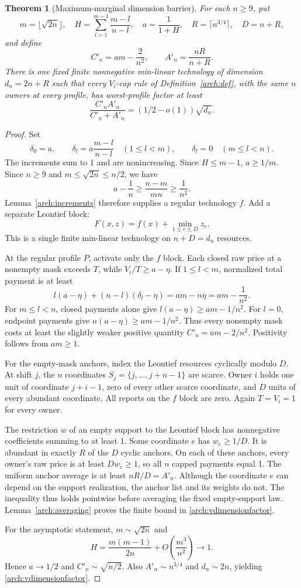\documentclass[11pt]{article}
\newtheorem{theorem}{Theorem}[section]
\theoremstyle{definition}\newtheorem{definition}[theorem]{Definition}
\theoremstyle{remark}\newtheorem{remark}[theorem]{Remark}
\begin{document}
\begin{theorem}[Maximum-marginal dimension barrier]
\label{arch:vdimension}
For each $n\ge9$, put
\[
 m=\lfloor\sqrt{2n}\rfloor,\quad
 H=\sum_{l=1}^{m-1}\frac{m-l}{n-l},\quad a=\frac1{1+H},
 \quad R=\lceil n^{3/4}\rceil,\quad D=n+R,
\]
and define
\[
 C'_n=am-\frac2{n^2},\qquad A'_n=\frac{nR}{n+R}.
\]
There is one fixed finite nonnegative min-linear technology of dimension
$d_n=2n+R$ such that every $V_i$-cap rule of
Definition~\ref{arch:def}, with the same $n$ owners at every profile, has
worst-profile factor at least
\begin{equation}\label{arch:vdimensionfactor}
 \frac{C'_nA'_n}{C'_n+A'_n}
       =(1/2-o(1))\sqrt{d_n}.
\end{equation}
\end{theorem}
\begin{proof}
Set
\[
 \delta_0=a,\qquad
 \delta_l=a\frac{m-l}{n-l}\quad(1\le l<m),\qquad
 \delta_l=0\quad(m\le l<n).
\]
The increments sum to 1 and are nonincreasing. Since $H\le m-1$,
$a\ge1/m$. Since $n\ge9$ and $m\le\sqrt{2n}\le n/2$, we have
\[
 a-\frac1n\ge\frac{n-m}{mn}\ge\frac1{n^2}.
\]
Lemma~\ref{arch:increments} therefore supplies a regular technology $f$.
Add a separate Leontief block:
\[
 F(x,z)=f(x)+\min_{1\le e\le D}z_e.
\]
This is a single finite min-linear technology on $n+D=d_n$ resources.

At the regular profile $P$, activate only the $f$ block. Each closed
raw price at a nonempty mask exceeds $T$, while
$V_i/T\ge a-\eta$. If $1\le l<m$, normalized total payment is at least
\[
 l(a-\eta)+(n-l)(\delta_l-\eta)
 =am-n\eta=am-\frac1{n^2}.
\]
For $m\le l<n$, closed payments alone give
$l(a-\eta)\ge am-1/n^2$. For $l=0$, endpoint payments give
$n(a-\eta)\ge am-1/n^2$. Thus every nonempty mask costs at least the
slightly weaker positive quantity $C'_n=am-2/n^2$.
Positivity follows from $am\ge1$.

For the empty-mask anchors, index the Leontief resources cyclically modulo
$D$. At shift $j$, the $n$ coordinates $S_j=\{j,\ldots,j+n-1\}$ are
scarce. Owner $i$ holds one unit of coordinate $j+i-1$, zero of every
other scarce coordinate, and $D$ units of every abundant coordinate.
All reports on the $f$ block are zero. Again $T=V_i=1$ for every owner.

The restriction $w$ of an empty support to the Leontief block has
nonnegative coefficients summing to at least 1. Some coordinate $e$ has
$w_e\ge1/D$. It is abundant in exactly $R$ of the $D$ cyclic anchors.
On each of these anchors, every owner's raw price is at least
$D w_e\ge1$, so all $n$ capped payments equal 1.
The uniform anchor average is at least $nR/D=A'_n$.
Although the coordinate $e$ can depend on the support realization, the
anchor list and its weights do not. The inequality thus holds pointwise
before averaging the fixed empty-support law.
Lemma~\ref{arch:averaging} proves the finite bound in
\eqref{arch:vdimensionfactor}.

For the asymptotic statement, $m\sim\sqrt{2n}$ and
\[
 H=\frac{m(m-1)}{2n}+O\left(\frac{m^3}{n^2}\right)\longrightarrow1.
\]
Hence $a\to 1/2$ and $C'_n\sim\sqrt{n/2}$. Also
$A'_n\sim n^{3/4}$ and $d_n\sim2n$, yielding
\eqref{arch:vdimensionfactor}.
\end{proof}
\end{document}
